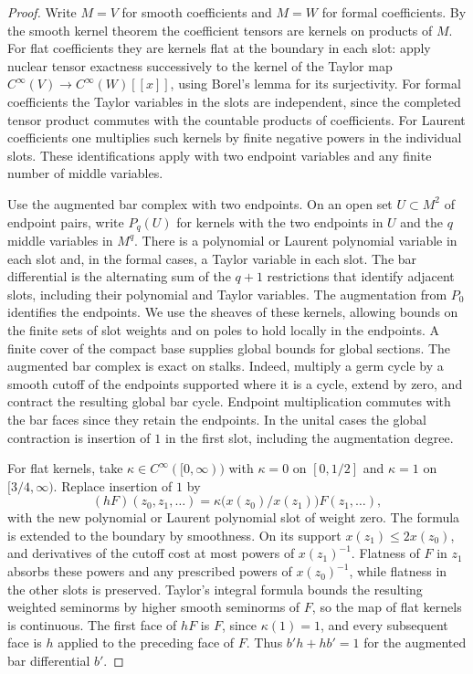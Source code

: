 \documentclass[11pt,oneside,reqno]{article}
\theoremstyle{plain}
\theoremstyle{definition}
\theoremstyle{remark}
\begin{document}
\begin{proof}
Write \(M=V\) for smooth coefficients and \(M=W\) for formal
coefficients. By the smooth kernel theorem the coefficient tensors
are kernels on products of \(M\). For flat coefficients they are
kernels flat at the boundary in each slot: apply nuclear tensor
exactness successively to the kernel of the Taylor map
\(C^\infty(V)\to C^\infty(W)[[x]]\), using Borel's lemma for its
surjectivity. For formal coefficients the Taylor variables in the
slots are independent, since the completed tensor product commutes
with the countable products of coefficients. For Laurent coefficients
one multiplies such kernels by finite negative powers in the
individual slots. These identifications apply with two endpoint
variables and any finite number of middle variables.

Use the augmented bar complex with two endpoints. On an open set
\(U\subset M^2\) of endpoint pairs, write \(P_q(U)\) for kernels with
the two endpoints in \(U\) and the \(q\) middle variables in \(M^q\).
There is a polynomial or Laurent polynomial variable in each slot
and, in the formal cases, a Taylor variable in each slot. The bar
differential is the alternating sum of the \(q+1\) restrictions that
identify adjacent slots, including their polynomial and Taylor
variables. The augmentation from \(P_0\) identifies the endpoints.
We use the sheaves of these kernels, allowing bounds on the finite
sets of slot weights and on poles to hold locally in the endpoints.
A finite cover of the compact base supplies global bounds for global
sections. The augmented bar complex is exact on stalks. Indeed,
multiply a germ cycle by a smooth cutoff of the endpoints supported
where it is a cycle, extend by zero, and contract the resulting global
bar cycle. Endpoint multiplication commutes with the bar faces
since they retain the endpoints. In the unital cases the global
contraction is insertion of \(1\) in the first slot, including the
augmentation degree.

For flat kernels, take \(\kappa\in C^\infty([0,\infty))\) with
\(\kappa=0\) on \([0,1/2]\) and \(\kappa=1\) on \([3/4,\infty)\).
Replace insertion of \(1\) by
\[
 (hF)(z_0,z_1,\ldots)=
   \kappa\bigl(x(z_0)/x(z_1)\bigr)F(z_1,\ldots),
\]
with the new polynomial or Laurent polynomial slot of weight zero.
The formula is extended to the boundary by smoothness. On its
support \(x(z_1)\le 2x(z_0)\), and derivatives of the cutoff cost at
most powers of \(x(z_1)^{-1}\). Flatness of \(F\) in \(z_1\) absorbs
these powers and any prescribed powers of \(x(z_0)^{-1}\), while
flatness in the other slots is preserved. Taylor's integral formula
bounds the resulting weighted seminorms by higher smooth seminorms
of \(F\), so the map of flat kernels is continuous. The
first face of \(hF\) is \(F\), since \(\kappa(1)=1\), and every
subsequent face is \(h\) applied to the preceding face of \(F\).
Thus \(b'h+hb'=1\) for the augmented bar differential \(b'\).


\end{proof}
\end{document}
